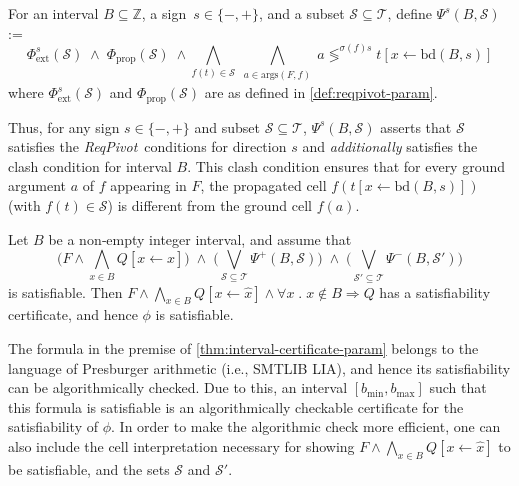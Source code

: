 \documentclass[runningheads]{llncs}
\newcommand{\cmpsignstrict}[1]{\lessgtr^{#1}}
\newcommand{\coeffsign}[1]{\sigma(#1)}
\newcommand{\ivbound}[2]{\text{bd}(#1,#2)}
\newcommand{\args}{\text{args}}
\newcommand{\req}{\emph{ReqPivot}\xspace}
\newcommand{\subst}[3]{#1[#2\leftarrow #3]}
\newcommand{\repr}[1]{\hat{#1}}
\begin{document}
\begin{definition}
\label{def:interval-extension-formulas-param}
For an interval $B\subseteq\mathbb{Z}$, a sign~$s\in\{-,+\}$, and a subset $\mathcal{S} \subseteq \mathcal{T}$, define
 $\Psi^{s}(B,\mathcal{S})$:=
    \[
    \Phi^{s}_{\text{ext}}(\mathcal{S})\;\land\; 
    \Phi_{\text{prop}}(\mathcal{S}) \;\land
    \bigwedge_{f(t) \in \mathcal{S}} \bigwedge_{\substack{a \in \args(F,f)}} a\cmpsignstrict{\coeffsign{f}s}  \subst{t}{x}{\ivbound{B}{s}} 
    \]
    where $\Phi^{s}_{\text{ext}}(\mathcal{S})$ and $\Phi_{\text{prop}}(\mathcal{S})$ are as defined in \cref{def:reqpivot-param}.
\end{definition}


Thus, for any sign $s\in\{-,+\}$ and subset $\mathcal{S}\subseteq\mathcal{T}$, $\Psi^s(B,\mathcal{S})$ asserts that $\mathcal{S}$ satisfies the \req\ conditions for direction $s$ and \emph{additionally} satisfies the clash condition for interval $B$. This clash condition ensures that for every ground argument $a$ of $f$ appearing in $F$, the propagated cell $f(\subst{t}{x}{\ivbound{B}{s}})$ (with $f(t)\in\mathcal{S}$) is different from the ground cell $f(a)$.

\begin{theorem}
\label{thm:interval-certificate-param}
Let $B$ be a non‑empty integer interval, and assume that
\[
  \Biggl(F \land \bigwedge_{x \in B} \subst{Q}{x}{\repr{x}}\Biggr) \;\land\;
  \Biggl(\bigvee_{\mathcal{S}\subseteq \mathcal{T}}\Psi^+(B,\mathcal{S})\Biggr)\;\land\;
  \Biggl(\bigvee_{\mathcal{S}'\subseteq \mathcal{T}}\Psi^-(B,\mathcal{S}')\Biggr)
\]
is satisfiable. Then  $F \land \bigwedge_{x \in B} \subst{Q}{x}{\repr{x}}\wedge \forall x\;.\; x\not\in B \Rightarrow Q$ has a satisfiability certificate, and hence $\phi$ is satisfiable.
\end{theorem}




The formula in the premise of \cref{thm:interval-certificate-param} belongs to the language of Presburger arithmetic (i.e., SMTLIB LIA), and hence its satisfiability can be algorithmically checked. Due to this, an interval $[b_{\min},b_{\max}]$ such that this formula is satisfiable is an algorithmically checkable certificate for the satisfiability of $\phi$. In order to make the algorithmic check more efficient, one can also include the cell interpretation necessary for showing $F \land \bigwedge_{x \in B} \subst{Q}{x}{\repr{x}}$ to be satisfiable, and the sets $\mathcal{S}$ and $\mathcal{S}'$.
\end{document}
